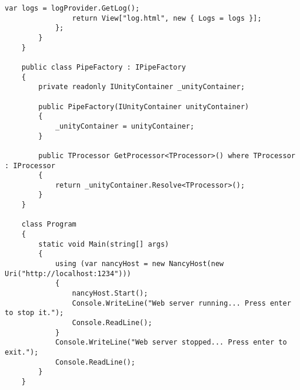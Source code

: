 \begin{lstlisting}[style=fsharpstyle,caption={Исходный код}, label=lst:recognition_result_handler]
                var logs = logProvider.GetLog();
                return View["log.html", new { Logs = logs }];
            };
        }
    }

    public class PipeFactory : IPipeFactory
    {
        private readonly IUnityContainer _unityContainer;

        public PipeFactory(IUnityContainer unityContainer)
        {
            _unityContainer = unityContainer;
        }

        public TProcessor GetProcessor<TProcessor>() where TProcessor : IProcessor
        {
            return _unityContainer.Resolve<TProcessor>();
        }
    }

    class Program
    {
        static void Main(string[] args)
        {
            using (var nancyHost = new NancyHost(new Uri("http://localhost:1234")))
            {
                nancyHost.Start();
                Console.WriteLine("Web server running... Press enter to stop it.");
                Console.ReadLine();
            }
            Console.WriteLine("Web server stopped... Press enter to exit.");
            Console.ReadLine();
        }
    }

    

\end{lstlisting}